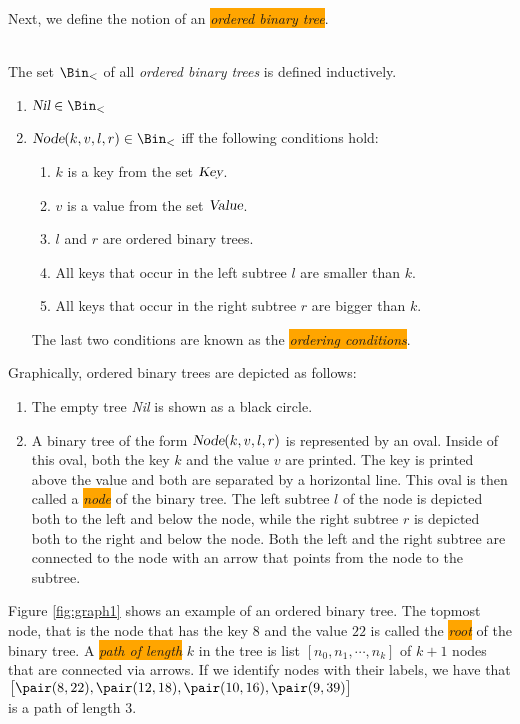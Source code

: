 \noindent
Next, we define the notion of an  \colorbox{orange}{\emph{ordered binary tree}}.
\begin{Definition} \hspace*{\fill} \\
  The set $\Bin_<$ of all \emph{ordered binary trees} is defined inductively.
  \begin{enumerate}
  \item $\textsl{Nil} \in \Bin_<$
  \item $\textsl{Node}(k, v, l, r) \in \Bin_<$ \quad iff the following conditions hold:
        \begin{enumerate}
        \item $k$ is a key from the set $\textsl{Key}$.
        \item $v$ is a value from the set $\textsl{Value}$.
        \item $l$ and $r$ are ordered binary trees.
        \item All keys that occur in the left subtree $l$ are smaller than $k$.
        \item All keys that occur in the right subtree $r$ are bigger than $k$.
        \end{enumerate}
        The last two conditions are known as the \colorbox{orange}{\emph{ordering conditions}}.
        \eox
  \end{enumerate}
\end{Definition}
Graphically, ordered binary trees are depicted as follows:
\begin{enumerate}
\item The empty tree \textsl{Nil} is shown as a black circle.
\item A binary tree of the form $\textsl{Node}(k,v,l,r)$ is represented by an oval.  Inside of this
      oval, both the key $k$ and the value $v$ are printed.  The key is printed above the value and
      both are separated by a horizontal line.  This oval is then called a
      \colorbox{orange}{\emph{node}} of the binary tree. 
      The left subtree $l$ of the node is depicted both to the left and  below the node,
      while the right subtree $r$ is depicted both to the right and below the node.  Both the left
      and the right subtree are connected to the node with an arrow that points from the node to the
      subtree.
\end{enumerate}
Figure \ref{fig:graph1} shows an example of an ordered binary tree.  The topmost node, that is the
node that has the key $8$ and the value $22$ is called the \colorbox{orange}{\emph{root}} of the binary tree.
A \colorbox{orange}{\emph{path of length}} $k$ in the tree is  list $[n_0,n_1, \cdots, n_k]$ of
$k+1$ nodes that are connected via arrows.  If we identify nodes with their labels, we have that
\\[0.1cm]
\hspace*{1.3cm} $\bigl[ \pair(8,22), \pair(12,18), \pair(10,16), \pair(9,39) \bigr]$ \\[0.1cm]
is a path of length 3.



